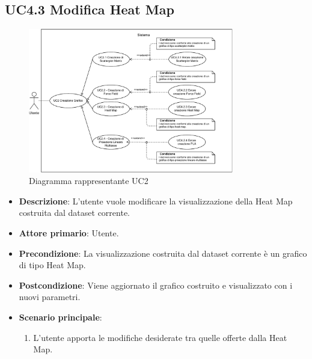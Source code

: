 %

\subsection{UC4.3 Modifica Heat Map}
\label{subsec:uc4.3}
\begin{figure}[h]
    \centering
    \includegraphics[width=0.8\textwidth]{componenti/casi-duso/diagrammi/UC2.pdf}
    \caption{Diagramma rappresentante UC2}
    \label{fig:UC2}
\end{figure}


\begin{itemize}
    \item \textbf{Descrizione}: L’utente vuole modificare la visualizzazione della Heat Map
                                costruita dal dataset corrente.
	
    \item \textbf{Attore primario}: Utente.
    
    \item \textbf{Precondizione}:   La visualizzazione costruita dal dataset corrente è un grafico di tipo Heat Map.

    \item \textbf{Postcondizione}:  Viene aggiornato il grafico costruito e visualizzato con i nuovi parametri.

	\item \textbf{Scenario principale}:
		\begin{enumerate}
            \item L'utente apporta le modifiche desiderate tra quelle offerte dalla Heat Map.
        \end{enumerate}
\end{itemize}

